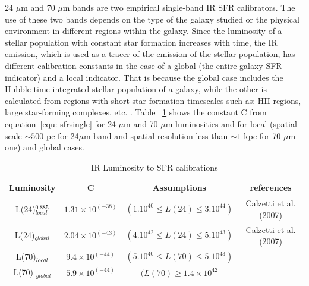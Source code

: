 24 $\mu$m and 70 $\mu$m bands are two empirical single-band IR SFR calibrators. The use of these two bands depends on the type of the galaxy studied or the physical environment in different regions within the galaxy. Since the luminosity of a stellar population with constant star formation increases with time, the IR emission, which is used as a tracer of the emission of the stellar population, has different calibration constants in the case of a global (the entire galaxy SFR indicator) and a local indicator. That is because the global case includes the Hubble time integrated stellar population of a galaxy, while the other is calculated from regions with short star formation timescales such as: HII regions, large star-forming complexes, etc. \cite{Calzetti13}. Table ~\ref{table2} shows the constant C from equation~\ref{equ: sfrsingle} for 24 $\mu$m and 70 $\mu$m luminosities and for local (spatial scale $\sim500$ pc for 24$\mu$m band and spatial resolution less than $\sim 1$ kpc for 70 $\mu$m one) and global cases. 

\begin{table}[ht]

\caption{IR Luminosity to SFR calibrations \label{table2}}
\centering
\begin{tabular}{ c c c c }
\hline\hline
Luminosity\footnotemark{} & C & Assumptions & references\\
\hline
L(24)$^{0.885}_{local}$ & $1.31 \times 10^{(-38)}$ &$(1.10^{40} \le L(24) \le 3.10^{44})$& Calzetti et al. (2007)  \\
L(24)$_{global}$ & $2.04 \times 10^{(-43)}$ &$ (4.10^{42} \le L(24)  \le 5.10^{43})$& Calzetti et al. (2007) \\
L(70)$_{local}$ & $9.4 \times 10^{(-44)} $ &$(5.10^{40} \le  L(70) \le 5.10^{43})$& \cite{Li12} \\
L(70) $_{global}$& $5.9 \times 10^{(-44)}$ &$(L(70) \ge 1.4 \times 10^{42} $& \cite{Li10}\\
\hline
\end{tabular}
\end{table}  

